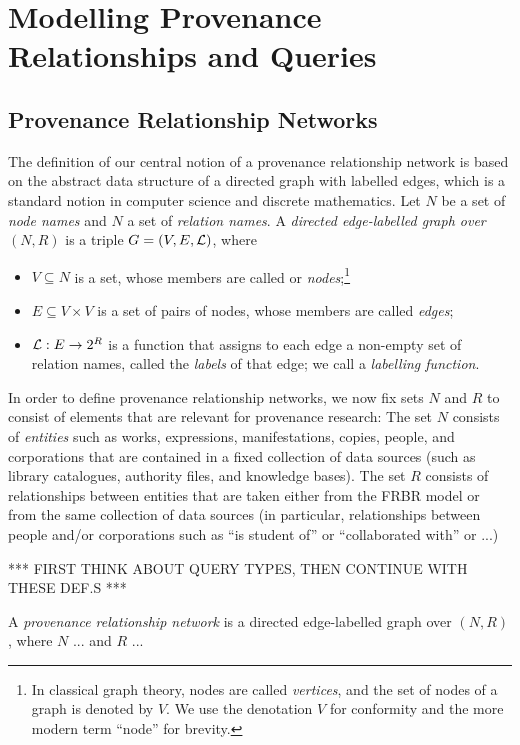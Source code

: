 
\chapter{Modelling Provenance Relationships and Queries}


\section{Provenance Relationship Networks}

The definition of our central notion of a provenance relationship network
is based on the abstract data structure of a directed graph with labelled edges,
which is a standard notion in computer science and discrete mathematics.
Let $N$ be a set of \emph{node names} and $N$ a set of \emph{relation names}.
A \emph{directed edge-labelled graph over $(N,R)$} is a triple $G = (V,E,\mathcal{L})$,
where
%
\begin{itemize}
  \item
  $V \subseteq N$ is a set, whose members are called or \emph{nodes};\footnote{%
    In classical graph theory, nodes are called \emph{vertices}, and the set of
    nodes of a graph is denoted by $V$. We use the denotation $V$ for conformity
    and the more modern term ``node'' for brevity.%
  }      
  \item 
  $E \subseteq V \times V$ is a set of pairs of nodes, whose members are called \emph{edges};
  \item
  $\mathcal{L} : E \to 2^R$ is a function that assigns to each edge a non-empty set of relation names,
  called the \emph{labels} of that edge; we call \Lmc a \emph{labelling function}.
\end{itemize}
%

In order to define provenance relationship networks, we now fix sets $N$ and $R$ to consist
of elements that are relevant for provenance research:
The set $N$ consists of \emph{entities} such as 
works, expressions, manifestations, copies, people, and corporations
that are contained in a fixed collection of data sources (such as library catalogues,
authority files, and knowledge bases). The set $R$ consists of relationships
between entities that are taken either from the FRBR model
or from the same collection of data sources (in particular, relationships between people and/or corporations
such as ``is student of'' or ``collaborated with'' or ...)

*** FIRST THINK ABOUT QUERY TYPES, THEN CONTINUE WITH THESE DEF.S ***


A \emph{provenance relationship network} is a directed edge-labelled graph over $(N,R)$,
where $N$ ... and $R$ ... 

